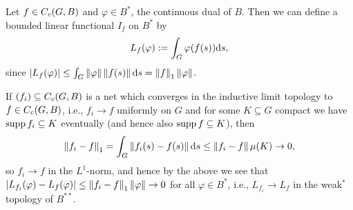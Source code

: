 \begin{definition}
Let $f \in C_c(G,B)$ and $\varphi \in B^*$, the continuous dual of $B$. Then we can define a bounded linear functional $I_f$ on $B^*$ by
\begin{align*}
	L_f(\varphi) := \int_G \varphi(f(s)) \mathrm{d} s,
\end{align*}
since $| L_f(\varphi)| \leq \int_G \left\lVert \varphi \right\rVert \left\lVert f(s) \right\rVert \mathrm{d} s = \left\lVert f \right\rVert_1 \left\lVert \varphi\right\rVert$.
\end{definition}
\begin{note}	
If $(f_i) \subseteq  C_c(G,B)$ is a net which converges in the inductive limit topology to $f \in C_c(G,B)$, i.e., $f_i \to f$ uniformly on $G$ and for some $K \subseteq G$ compact we have $\operatorname{supp} f_i \subseteq K$ eventually (and hence also $\operatorname{supp} f \subseteq K$), then
\begin{align*}
\left\lVert f_i - f\right\rVert_1 = \int_{G} \left\lVert f_i(s) - f(s) \right\rVert \mathrm{d} s 	\leq \left\lVert f_i - f \right\rVert \mu(K) \to 0,
\end{align*}
so $f_i \to f$ in the $L^1$-norm, and hence by the above we see that $|L_{f_i}(\varphi) - L_f(\varphi) | \leq \left\lVert f_i-f\right\rVert_1 \left\lVert \varphi \right\rVert \to 0$ for all $ \varphi \in B^*$, i.e.,  $L_{f_i}\to L_f$ in the weak$^*$ topology of $B^{**}$.
\label{note:induct}
\end{note}

